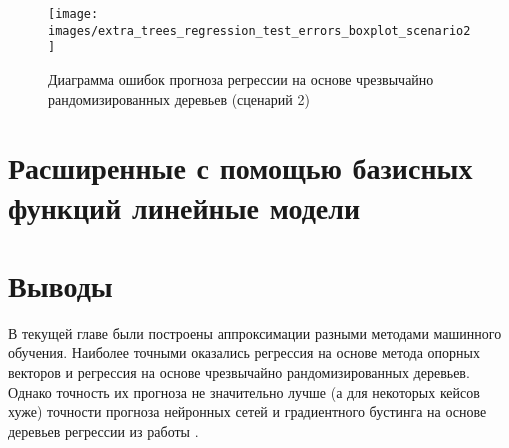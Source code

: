 \begin{figure}[H] 
	\center
	\texttt{[image: images/extra\_trees\_regression\_test\_errors\_boxplot\_scenario2]}
	\caption{Диаграмма ошибок прогноза регрессии на основе чрезвычайно рандомизированных деревьев (сценарий 2)} 
	\label{fig:extra-trees-reg-2}
\end{figure}

\section{Расширенные с помощью базисных функций линейные модели} \label{ch1:sec5}

\section{Выводы} \label{ch1:conclusion}

В текущей главе были построены аппроксимации разными методами машинного обучения. Наиболее точными оказались регрессия на основе метода опорных векторов и регрессия на основе чрезвычайно рандомизированных деревьев. Однако точность их прогноза не значительно лучше (а для некоторых кейсов хуже) точности прогноза нейронных сетей и градиентного бустинга на основе деревьев регрессии из работы \cite{muravtsev:metamodel}.




